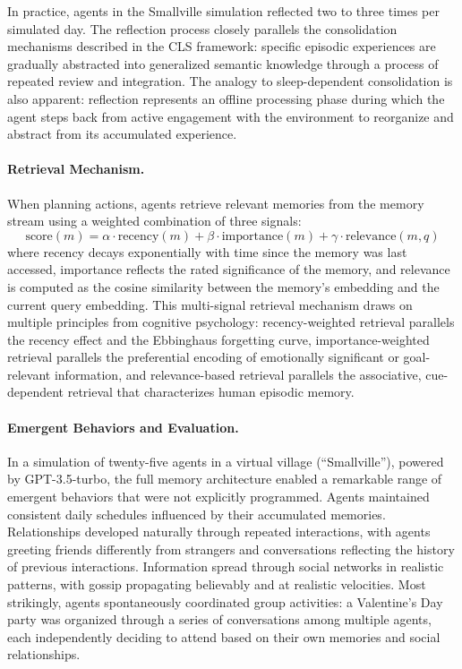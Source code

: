 In practice, agents in the Smallville simulation reflected two to three times per simulated day. The reflection process closely parallels the consolidation mechanisms described in the CLS framework: specific episodic experiences are gradually abstracted into generalized semantic knowledge through a process of repeated review and integration. The analogy to sleep-dependent consolidation is also apparent: reflection represents an offline processing phase during which the agent steps back from active engagement with the environment to reorganize and abstract from its accumulated experience.

\paragraph{Retrieval Mechanism.} When planning actions, agents retrieve relevant memories from the memory stream using a weighted combination of three signals:
\begin{equation}
\text{score}(m) = \alpha \cdot \text{recency}(m) + \beta \cdot \text{importance}(m) + \gamma \cdot \text{relevance}(m, q)
\end{equation}
where recency decays exponentially with time since the memory was last accessed, importance reflects the rated significance of the memory, and relevance is computed as the cosine similarity between the memory's embedding and the current query embedding. This multi-signal retrieval mechanism draws on multiple principles from cognitive psychology: recency-weighted retrieval parallels the recency effect and the Ebbinghaus forgetting curve, importance-weighted retrieval parallels the preferential encoding of emotionally significant or goal-relevant information, and relevance-based retrieval parallels the associative, cue-dependent retrieval that characterizes human episodic memory.

\paragraph{Emergent Behaviors and Evaluation.} In a simulation of twenty-five agents in a virtual village (``Smallville''), powered by GPT-3.5-turbo, the full memory architecture enabled a remarkable range of emergent behaviors that were not explicitly programmed. Agents maintained consistent daily schedules influenced by their accumulated memories. Relationships developed naturally through repeated interactions, with agents greeting friends differently from strangers and conversations reflecting the history of previous interactions. Information spread through social networks in realistic patterns, with gossip propagating believably and at realistic velocities. Most strikingly, agents spontaneously coordinated group activities: a Valentine's Day party was organized through a series of conversations among multiple agents, each independently deciding to attend based on their own memories and social relationships.

